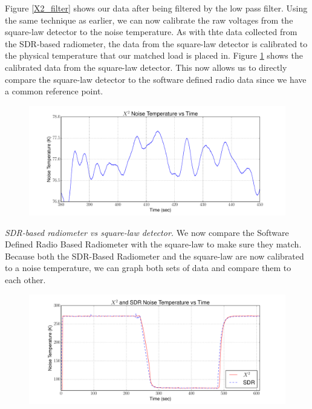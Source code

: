 Figure \ref{X2_filter} shows our data after being filtered by the low pass filter.  Using the same technique as earlier, we can now calibrate the raw voltages from the square-law detector to the noise temperature.  As with thte data collected from the SDR-based radiometer, the data from the square-law detector is calibrated to the physical temperature that our matched load is placed in.  Figure \ref{X2_Calibrated} shows the calibrated data from the square-law detector.  This now allows us to directly compare the square-law detector to the software defined radio data since we have a common reference point.

\begin{figure}[h!tb] \centering
\includegraphics[width=\textwidth]{Experiments/Exp1/x2_calibrated.pdf}
\label{X2_Calibrated}
\end{figure}

\emph{SDR-based radiometer vs square-law detector.}  We now compare the Software Defined Radio Based Radiometer with the square-law to make sure they match.  Because both the SDR-Based Radiometer and the square-law are now calibrated to a noise temperature, we can graph both sets of data and compare them to each other.

\begin{figure}[h!tb] \centering

\includegraphics[width=\textwidth]{Experiments/Exp1/x2_SDR_Calibrated.pdf}
\label{X2_SDR_Both}
\end{figure}

